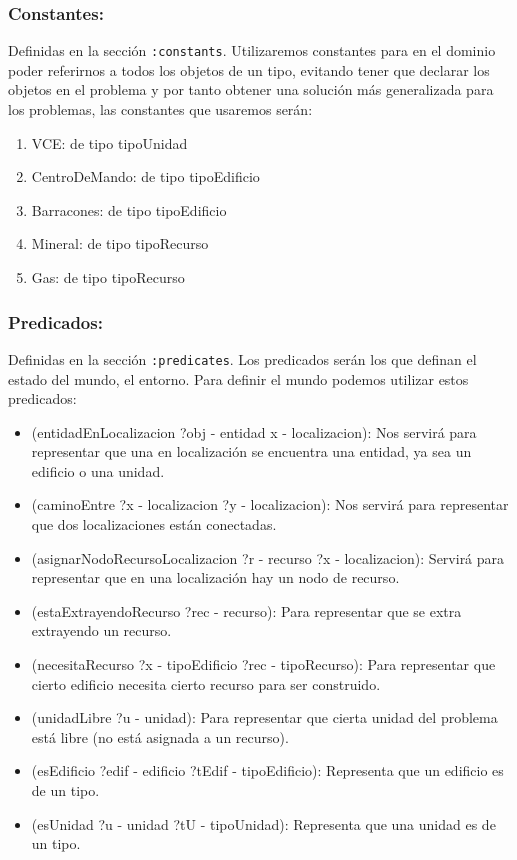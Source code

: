 \documentclass[10pt, spanish]{article}
\begin{document}
\subsubsection{Constantes:}

Definidas en la sección \texttt{:constants}. Utilizaremos constantes para en el dominio poder referirnos a todos los objetos de un tipo, evitando tener que declarar los objetos en el problema y por tanto obtener una solución más generalizada para los problemas, las constantes que usaremos serán:

\begin{enumerate}
	\item VCE: de tipo tipoUnidad
	\item CentroDeMando: de tipo tipoEdificio
	\item Barracones: de tipo tipoEdificio
	\item Mineral: de tipo tipoRecurso
	\item Gas: de tipo tipoRecurso
\end{enumerate}


\subsubsection{Predicados:}


Definidas en la sección \texttt{:predicates}. Los predicados serán los que definan el estado del mundo, el entorno. Para definir el mundo podemos utilizar estos predicados:

\begin{itemize}
	\item (entidadEnLocalizacion ?obj - entidad x - localizacion): Nos servirá para representar que una en localización se encuentra una entidad, ya sea un edificio o una unidad.
	\item (caminoEntre ?x - localizacion ?y - localizacion): Nos servirá para representar que dos localizaciones están conectadas.
	\item (asignarNodoRecursoLocalizacion ?r - recurso ?x - localizacion): Servirá para representar que en una localización hay un nodo de recurso.
	\item (estaExtrayendoRecurso ?rec - recurso): Para representar que se extra extrayendo un recurso.
	\item (necesitaRecurso ?x - tipoEdificio ?rec - tipoRecurso): Para representar que cierto edificio necesita cierto recurso para ser construido.
	\item (unidadLibre ?u - unidad): Para representar que cierta unidad del problema está libre (no está asignada a un recurso).
	\item (esEdificio ?edif - edificio ?tEdif - tipoEdificio): Representa que un edificio es de un tipo.
	\item (esUnidad ?u - unidad ?tU - tipoUnidad): Representa que una unidad es de un tipo.
	
\end{itemize}
\end{document}
